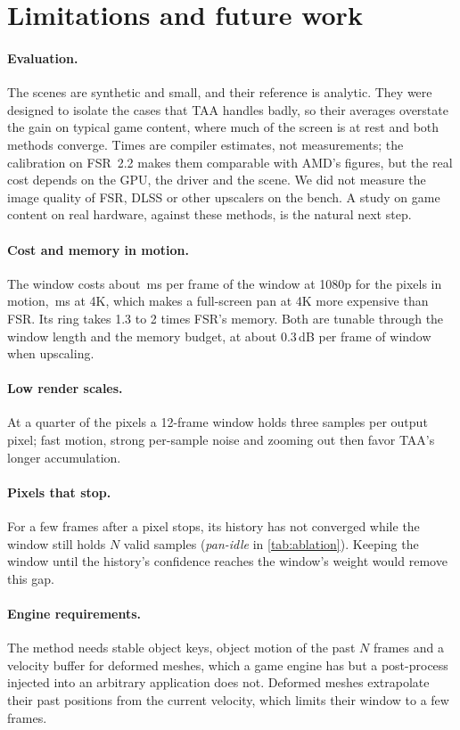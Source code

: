 \documentclass[11pt,a4paper]{article}
\begin{document}
\section{Limitations and future work}
\label{sec:limitations}

\paragraph{Evaluation.} The scenes are synthetic and small, and their reference is analytic. They were designed to isolate the cases that TAA handles badly, so their averages overstate the gain on typical game content, where much of the screen is at rest and both methods converge. Times are compiler estimates, not measurements; the calibration on FSR~2.2 makes them comparable with AMD's figures, but the real cost depends on the GPU, the driver and the scene. We did not measure the image quality of FSR, DLSS or other upscalers on the bench. A study on game content on real hardware, against these methods, is the natural next step.

\paragraph{Cost and memory in motion.} The window costs about \nMsPerFrameHd{}\,ms per frame of the window at 1080p for the pixels in motion, \nMsPerFrameUhd{}\,ms at 4K, which makes a full-screen pan at 4K more expensive than FSR. Its ring takes 1.3 to 2 times FSR's memory. Both are tunable through the window length and the memory budget, at about 0.3\,dB per frame of window when upscaling.

\paragraph{Low render scales.} At a quarter of the pixels a 12-frame window holds three samples per output pixel; fast motion, strong per-sample noise and zooming out then favor TAA's longer accumulation.

\paragraph{Pixels that stop.} For a few frames after a pixel stops, its history has not converged while the window still holds $N$ valid samples (\emph{pan-idle} in \cref{tab:ablation}). Keeping the window until the history's confidence reaches the window's weight would remove this gap.

\paragraph{Engine requirements.} The method needs stable object keys, object motion of the past $N$ frames and a velocity buffer for deformed meshes, which a game engine has but a post-process injected into an arbitrary application does not. Deformed meshes extrapolate their past positions from the current velocity, which limits their window to a few frames.
\end{document}
